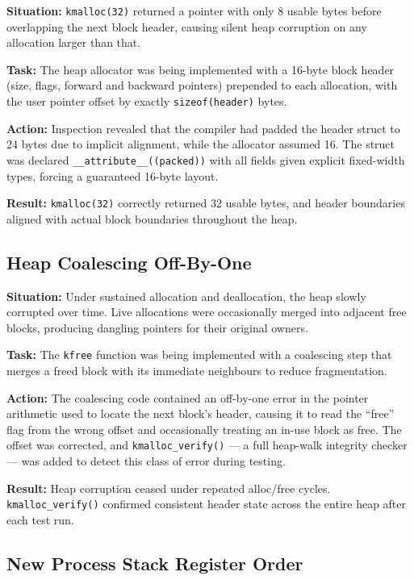 \documentclass[12pt,a4paper]{article}
\begin{document}
\textbf{Situation:} \texttt{kmalloc(32)} returned a pointer with only 8 usable bytes before overlapping the next block header, causing silent heap corruption on any allocation larger than that.

\textbf{Task:} The heap allocator was being implemented with a 16-byte block header (size, flags, forward and backward pointers) prepended to each allocation, with the user pointer offset by exactly \texttt{sizeof(header)} bytes.

\textbf{Action:} Inspection revealed that the compiler had padded the header struct to 24 bytes due to implicit alignment, while the allocator assumed 16. The struct was declared \texttt{\_\_attribute\_\_((packed))} with all fields given explicit fixed-width types, forcing a guaranteed 16-byte layout.

\textbf{Result:} \texttt{kmalloc(32)} correctly returned 32 usable bytes, and header boundaries aligned with actual block boundaries throughout the heap.

\subsection{Heap Coalescing Off-By-One}

\textbf{Situation:} Under sustained allocation and deallocation, the heap slowly corrupted over time. Live allocations were occasionally merged into adjacent free blocks, producing dangling pointers for their original owners.

\textbf{Task:} The \texttt{kfree} function was being implemented with a coalescing step that merges a freed block with its immediate neighbours to reduce fragmentation.

\textbf{Action:} The coalescing code contained an off-by-one error in the pointer arithmetic used to locate the next block's header, causing it to read the ``free'' flag from the wrong offset and occasionally treating an in-use block as free. The offset was corrected, and \texttt{kmalloc\_verify()} --- a full heap-walk integrity checker --- was added to detect this class of error during testing.

\textbf{Result:} Heap corruption ceased under repeated alloc/free cycles. \texttt{kmalloc\_verify()} confirmed consistent header state across the entire heap after each test run.

\subsection{New Process Stack Register Order}
\end{document}
